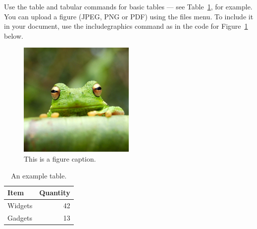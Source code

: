 Use the table and tabular commands for basic tables --- see Table~\ref{tab:widgets}, for example. You can upload a figure (JPEG, PNG or PDF) using the files menu. To include it in your document, use the includegraphics command as in the code for Figure~\ref{fig:frog} below.

\begin{figure}
\centering
\includegraphics[width=0.5\textwidth]{frog.jpg}
\caption{\label{fig:frog}This is a figure caption.}
\end{figure}

\begin{table}
\centering
\begin{tabular}{l|r}
Item & Quantity \\\hline
Widgets & 42 \\
Gadgets & 13
\end{tabular}
\caption{\label{tab:widgets}An example table.}
\end{table}